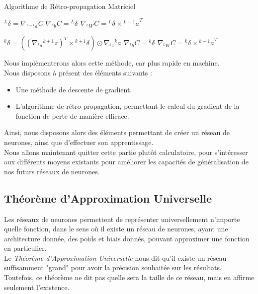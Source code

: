 \documentclass[10pt,a4paper]{report}
\newcommand{\lexp}[1]{\phantom{}^{#1}}
\newcommand{\elem}[4]{\lexp{#2}#1^{#3}_{#4}}
\begin{document}
		\begin{algorithm}[H]
			\caption{Algorithme de Rétro-propagation Matriciel}
			\begin{algorithmic}
			    \STATE
			    \STATE $\elem{\delta}{L}{}{} = \nabla_{\elem{a}{L-1}{}{}} C$
			    \STATE $\nabla_{\elem{b}{L}{}{}} C = \elem{\delta}{L}{}{}$
			    \STATE $\nabla_{\elem{W}{L}{}{}} C = \elem{\delta}{L}{}{} \times{\elem{a}{L-1}{}{}}^T $
			    
			    	\STATE
			    	\STATE $\elem{\delta}{k}{}{} = ((\nabla_{\elem{a}{k}{}{}}\elem{z}{k+1}{}{})^T \times \elem{\delta}{k+1}{}{}) \odot \nabla_{\elem{z}{k}{}{}}{\elem{a}{k}{}{}}$
			    	\STATE $\nabla_{\elem{b}{k}{}{}} C = \elem{\delta}{k}{}{}$
			    	\STATE $\nabla_{\elem{W}{k}{}{}} C = \elem{\delta}{k}{}{} \times{\elem{a}{k-1}{}{}}^T $
			    \ENDFOR
			\end{algorithmic}
		\end{algorithm}
		Nous implémenterons alors cette méthode, car plus rapide en machine.\\
		Nous disposons à présent des éléments suivants :
		\begin{itemize}
			\item Une méthode de descente de gradient.
			\item L'algorithme de rétro-propagation, permettant le calcul du gradient de la fonction de perte de manière efficace.
		\end{itemize}
		Ainsi, nous disposons alors des éléments permettant de créer un réseau de neurones, ainsi que d'effectuer son apprentissage.\\
		Nous allons maintenant quitter cette partie plutôt calculatoire, pour s'intéresser aux différents moyens existants pour améliorer les capacités de généralisation de nos futurs réseaux de neurones.
		\subsection{Théorème d'Approximation Universelle}
		Les réseaux de neurones permettent de représenter universellement n'importe quelle fonction, dans le sens où il existe un réseau de neurones, ayant une architecture donnée, des poids et biais donnés, pouvant approximer une fonction en particulier.\\
		Le \emph{Théorème d'Approximation Universelle} nous dit qu'il existe un réseau suffisamment "grand" pour avoir la précision souhaitée sur les résultats.\\
		Toutefois, ce théorème ne dit pas quelle sera la taille de ce réseau, mais en affirme seulement l'existence.
\end{document}
